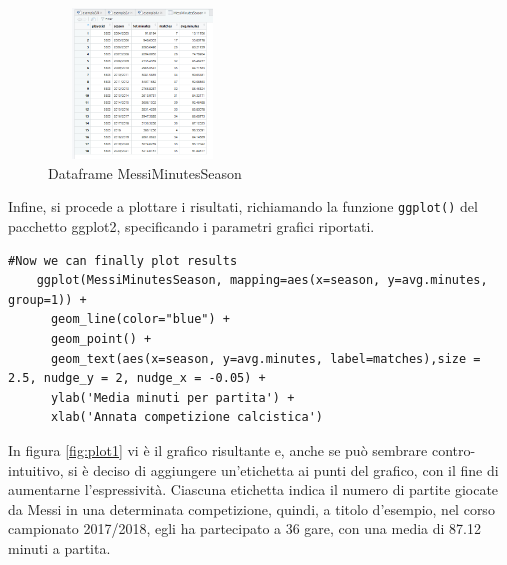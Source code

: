             \begin{figure}[h]
                \includegraphics[height=4cm, width=5cm]{immagini/MessiMinutesSeason.png}
                \centering
                \caption{Dataframe MessiMinutesSeason}
                \label{fig:MessiMinutesSeason}
            \end{figure}

            Infine, si procede a plottare i risultati, richiamando la funzione \texttt{ggplot()} del pacchetto ggplot2, specificando i parametri grafici riportati.

            \begin{lstlisting}[numbers=None]
    #Now we can finally plot results
    ggplot(MessiMinutesSeason, mapping=aes(x=season, y=avg.minutes, group=1)) +
      geom_line(color="blue") +
      geom_point() +
      geom_text(aes(x=season, y=avg.minutes, label=matches),size = 2.5, nudge_y = 2, nudge_x = -0.05) +
      ylab('Media minuti per partita') + 
      xlab('Annata competizione calcistica')
            \end{lstlisting}

            In figura \ref{fig:plot1} vi è il grafico risultante e, anche se può sembrare contro-intuitivo, si è deciso di aggiungere un'etichetta ai punti del grafico, con il fine di aumentarne l'espressività. Ciascuna etichetta indica il numero di partite giocate da Messi in una determinata competizione, quindi, a titolo d'esempio, nel corso campionato  2017/2018, egli ha partecipato a 36 gare, con una media di 87.12 minuti a partita. 
            
